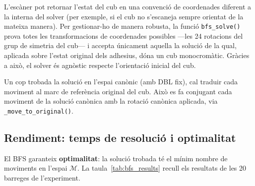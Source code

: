 \documentclass[12pt, a4paper]{article}
\begin{document}
L'escàner pot retornar l'estat del cub en una convenció de coordenades diferent a la interna del solver (per exemple, si el cub no s'escaneja sempre orientat de la mateixa manera). Per gestionar-ho de manera robusta, la funció \texttt{bfs\_solve()} prova totes les transformacions de coordenades possibles —les 24 rotacions del grup de simetria del cub— i accepta únicament aquella la solució de la qual, aplicada sobre l'estat original dels adhesius, dóna un cub monocromàtic. Gràcies a això, el solver és agnòstic respecte l'orientació inicial del cub.

Un cop trobada la solució en l'espai canònic (amb DBL fix), cal traduir cada moviment al marc de referència original del cub. Això es fa conjugant cada moviment de la solució canònica amb la rotació canònica aplicada, via \texttt{\_move\_to\_original()}.

\subsection{Rendiment: temps de resolució i optimalitat}

El BFS garanteix \textbf{optimalitat}: la solució trobada té el mínim nombre de moviments en l'espai $\mathcal{M}$. La taula~\ref{tab:bfs_results} recull els resultats de les 20 barreges de l'experiment.
\end{document}
